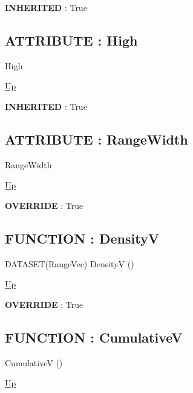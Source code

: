 \par
\par
\textbf{INHERITED} : True \\
\subsection*{ATTRIBUTE : High}
\hypertarget{ecldoc:linearregression.ols.distributionbase.high}{}
\begin{minipage}[t]{\textwidth}
\begin{flushleft}
 High 
\end{flushleft}
\end{minipage}
\hyperlink{ecldoc:linearregression.ols.normaldistribution}{Up}

\par
\par
\textbf{INHERITED} : True \\
\subsection*{ATTRIBUTE : RangeWidth}
\hypertarget{ecldoc:linearregression.ols.distributionbase.rangewidth}{}
\begin{minipage}[t]{\textwidth}
\begin{flushleft}
 RangeWidth 
\end{flushleft}
\end{minipage}
\hyperlink{ecldoc:linearregression.ols.normaldistribution}{Up}

\par
\par
\textbf{OVERRIDE} : True \\
\subsection*{FUNCTION : DensityV}
\hypertarget{ecldoc:linearregression.ols.distributionbase.densityv}{}
\begin{minipage}[t]{\textwidth}
\begin{flushleft}
DATASET(RangeVec) DensityV ()
\end{flushleft}
\end{minipage}
\hyperlink{ecldoc:linearregression.ols.normaldistribution}{Up}

\par
\par
\textbf{OVERRIDE} : True \\
\subsection*{FUNCTION : CumulativeV}
\hypertarget{ecldoc:linearregression.ols.distributionbase.cumulativev}{}
\begin{minipage}[t]{\textwidth}
\begin{flushleft}
 CumulativeV ()
\end{flushleft}
\end{minipage}
\hyperlink{ecldoc:linearregression.ols.normaldistribution}{Up}

